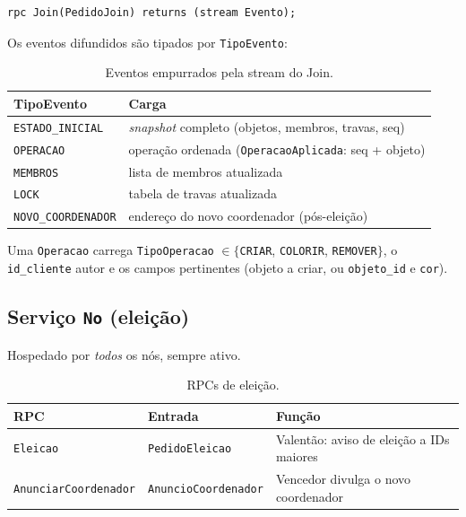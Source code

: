 \begin{lstlisting}[language={},caption={Streaming do Join}]
rpc Join(PedidoJoin) returns (stream Evento);
\end{lstlisting}

Os eventos difundidos são tipados por \texttt{TipoEvento}:

\begin{table}[H]
  \centering
  \begin{tabular}{@{}ll@{}}
    \toprule
    \textbf{TipoEvento} & \textbf{Carga} \\
    \midrule
    \texttt{ESTADO\_INICIAL}   & \emph{snapshot} completo (objetos, membros, travas, seq) \\
    \texttt{OPERACAO}          & operação ordenada (\texttt{OperacaoAplicada}: seq + objeto) \\
    \texttt{MEMBROS}           & lista de membros atualizada \\
    \texttt{LOCK}              & tabela de travas atualizada \\
    \texttt{NOVO\_COORDENADOR} & endereço do novo coordenador (pós-eleição) \\
    \bottomrule
  \end{tabular}
  \caption{Eventos empurrados pela stream do Join.}
\end{table}

Uma \texttt{Operacao} carrega \texttt{TipoOperacao} $\in \{$\texttt{CRIAR}, \texttt{COLORIR},
\texttt{REMOVER}$\}$, o \texttt{id\_cliente} autor e os campos pertinentes (objeto a criar,
ou \texttt{objeto\_id} e \texttt{cor}).

\subsection{Serviço \texttt{No} (eleição)}

Hospedado por \emph{todos} os nós, sempre ativo.

\begin{table}[H]
  \centering
  \begin{tabular}{@{}lll@{}}
    \toprule
    \textbf{RPC} & \textbf{Entrada} & \textbf{Função} \\
    \midrule
    \texttt{Eleicao}            & \texttt{PedidoEleicao}     & Valentão: aviso de eleição a IDs maiores \\
    \texttt{AnunciarCoordenador}& \texttt{AnuncioCoordenador}& Vencedor divulga o novo coordenador \\
    \bottomrule
  \end{tabular}
  \caption{RPCs de eleição.}
\end{table}

